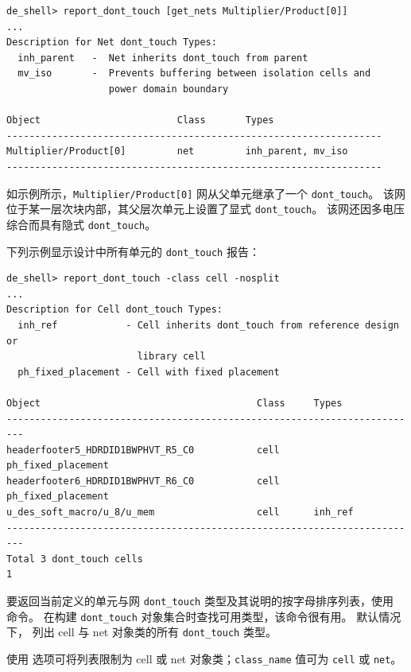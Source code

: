 \begin{lstlisting}
de_shell> report_dont_touch [get_nets Multiplier/Product[0]]
...
Description for Net dont_touch Types:
  inh_parent   -  Net inherits dont_touch from parent
  mv_iso       -  Prevents buffering between isolation cells and
                  power domain boundary

Object                        Class       Types
------------------------------------------------------------------
Multiplier/Product[0]         net         inh_parent, mv_iso
------------------------------------------------------------------
\end{lstlisting}

如示例所示，\texttt{Multiplier/Product[0]} 网从父单元继承了一个 \texttt{dont\_touch}。
该网位于某一层次块内部，其父层次单元上设置了显式 \texttt{dont\_touch}。
该网还因多电压综合而具有隐式 \texttt{dont\_touch}。

下列示例显示设计中所有单元的 \texttt{dont\_touch} 报告：
\begin{lstlisting}
de_shell> report_dont_touch -class cell -nosplit
...
Description for Cell dont_touch Types:
  inh_ref            - Cell inherits dont_touch from reference design or
                       library cell
  ph_fixed_placement - Cell with fixed placement

Object                                      Class     Types
-------------------------------------------------------------------------
headerfooter5_HDRDID1BWPHVT_R5_C0           cell      ph_fixed_placement
headerfooter6_HDRDID1BWPHVT_R6_C0           cell      ph_fixed_placement
u_des_soft_macro/u_8/u_mem                  cell      inh_ref
-------------------------------------------------------------------------
Total 3 dont_touch cells
1
\end{lstlisting}

要返回当前定义的单元与网 \texttt{dont\_touch} 类型及其说明的按字母排序列表，使用  命令。
在构建 \texttt{dont\_touch} 对象集合时查找可用类型，该命令很有用。
默认情况下， 列出 cell 与 net 对象类的所有 \texttt{dont\_touch} 类型。

使用  选项可将列表限制为 cell 或 net 对象类；\texttt{class\_name} 值可为 \texttt{cell} 或 \texttt{net}。

